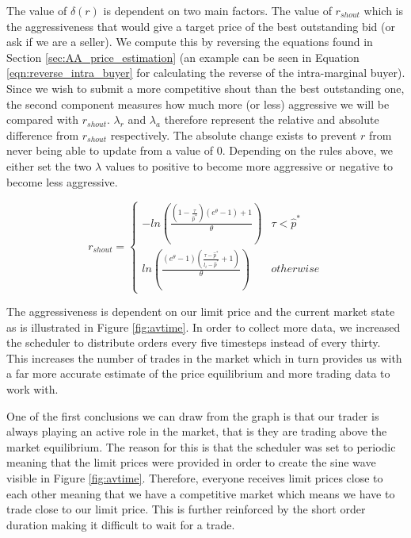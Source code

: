 \documentclass[preprint]{acm_proc_article-sp} %
\begin{document}
The value of $\delta(r)$ is dependent on two main factors. The value of
$r_{shout}$ which is the aggressiveness that would give a target price of the
best outstanding bid (or ask if we are a seller). We compute this by reversing
the equations found in Section \ref{sec:AA_price_estimation} (an example can be seen in
Equation \ref{eqn:reverse_intra_buyer} for calculating the reverse of the
intra-marginal buyer).  Since we wish to submit a more competitive shout than the best
outstanding one, the second component measures how much more (or less)
aggressive we will be compared with $r_{shout}$.  $\lambda_r$ and $\lambda_a$
therefore represent the relative and absolute difference from $r_{shout}$
respectively. %
The absolute change exists to prevent $r$ from never being able
to update from a value of 0. Depending on the rules above, we either set the
two $\lambda$ values to positive to become more aggressive or negative to become less
aggressive.


\begin{equation}
r_{shout}=
\begin{cases}
 -ln\left(\frac{ (1-\frac{\tau}{\hat p^*}) (e^\theta-1) + 1}{\theta}\right) & \tau
< \hat p^*\\
ln\left( \frac{(e^\theta -1) (\frac{\tau - \hat p^*}{l_i - \hat p^*} + 1)
}{\theta} \right)&
\textstyle{otherwise}
\end{cases}
\label{eqn:reverse_intra_buyer}
\end{equation}

The aggressiveness is dependent on our limit price and the current market state as
is illustrated in Figure \ref{fig:avtime}. In order to collect more data, we
increased the scheduler to distribute orders every five timesteps instead of
every thirty. This increases the number of trades in the market which in turn
provides us with a far more accurate estimate of the price equilibrium and more
trading data to work with.

One of the first conclusions we can draw from the graph is that our trader is
always playing an active role in the market, that is they are trading above the
market equilibrium. The reason for this is that the scheduler was set to
periodic meaning that the limit prices were provided in order to create the
sine wave visible in Figure \ref{fig:avtime}. Therefore, everyone receives limit
prices close to each other meaning that we have a competitive market which
means we have to trade close to our limit price. This is further reinforced by
the short order duration making it difficult to wait for a trade.
\end{document}
